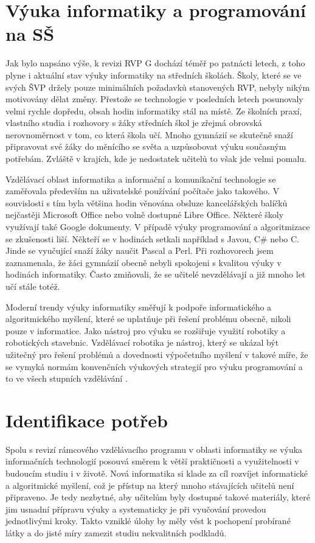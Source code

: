 \documentclass[
  digital,     %
  oneside,     %
  nosansbold,  %
  colorbold, %
  lof,         %
  nolot,         %
]{fithesis4}
\begin{document}
\section{Výuka informatiky a programování na SŠ}
Jak bylo napsáno výše, k revizi RVP G dochází téměř po patnácti letech, z toho plyne i aktuální stav výuky informatiky na středních školách. Školy, které se ve svých ŠVP držely pouze minimálních požadavků stanovených RVP, nebyly nikým motivovány dělat změny. Přestože se technologie v posledních letech posunovaly velmi rychle dopředu, obsah hodin informatiky stál na místě. Ze školních praxí, vlastního studia i rozhovory s žáky středních škol je zřejmá obrovská nerovnoměrnost v tom, co která škola učí. Mnoho gymnázií se skutečně snaží připravovat své žáky do měnícího se světa a uzpůsobovat výuku současným potřebám. Zvláště v krajích, kde je nedostatek učitelů to však jde velmi pomalu.

Vzdělávací oblast informatika a informační a komunikační technologie se zaměřovala především na uživatelské používání počítače jako takového. V souvislosti s tím byla většina hodin věnována obsluze kancelářských balíčků nejčastěji Microsoft Office nebo volně dostupné Libre Office. Některé školy využívají také Google dokumenty. V případě výuky programování a algoritmizace se zkušenosti liší. Někteří se v hodinách setkali například s Javou, C\# nebo C. Jinde se vyučující snaží žáky naučit Pascal a Perl. Při rozhovorech jsem zaznamenala, že  žáci gymnázií obecně nebyli spokojeni s kvalitou výuky v hodinách informatiky. Často zmiňovali, že se učitelé nevzdělávají a již mnoho let učí stále totéž.

Moderní trendy výuky informatiky směřují k podpoře informatického a algoritmického myšlení, které se uplatňuje při řešení problému obecně, nikoli pouze v informatice. Jako nástroj pro výuku se rozšiřuje využití robotiky a robotických stavebnic. Vzdělávací robotika je nástroj, který se ukázal být užitečný pro řešení problémů a dovednosti výpočetního myšlení v takové míře, že se vymyká normám konvenčních výukových strategií pro výuku programování a to ve všech stupních vzdělávání \cite{Noor20}. 

\section{Identifikace potřeb}
Spolu s revizí rámcového vzdělávacího programu v oblasti informatiky se výuka informačních technologií posouvá směrem k větší praktičnosti a využitelnosti v budoucím studiu i v životě. Nová informatika si klade za cíl rozvíjet informatické a algoritmické myšlení, což je přístup na který mnoho stávajících učitelů není připraveno. Je tedy nezbytné, aby učitelům byly dostupné takové materiály, které jim usnadní přípravu výuky a systematicky je při vyučování provedou jednotlivými kroky. Takto vzniklé úlohy by měly vést k pochopení probírané látky a do jisté míry zamezit studiu nekvalitních podkladů.
\end{document}
